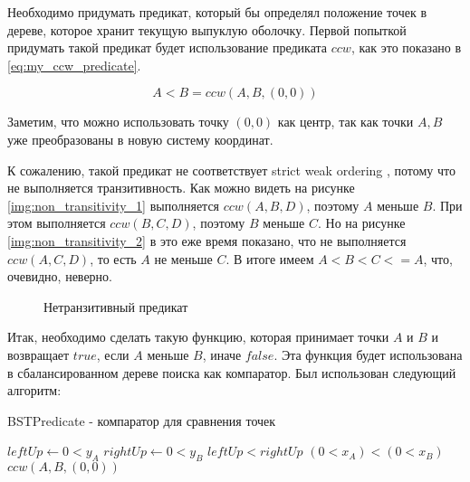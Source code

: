 Необходимо придумать предикат, который бы определял положение точек в дереве, которое хранит текущую выпуклую оболочку. Первой попыткой придумать такой предикат будет использование предиката $ccw$, как это показано в \ref{eq:my_ccw_predicate}.

\begin{equation}\label{eq:my_ccw_predicate}
A<B=ccw(A, B, (0, 0))
\end{equation}

Заметим, что можно использовать точку $(0, 0)$ как центр, так как точки $A, B$ уже преобразованы в новую систему координат.

К сожалению, такой предикат не соответствует strict weak ordering \cite{isoCppStd2017}, потому что не выполняется транзитивность. Как можно видеть на рисунке \ref{img:non_transitivity_1} выполняется $ccw(A, B, D)$, поэтому $A$ меньше $B$. При этом выполняется $ccw(B, C, D)$, поэтому $B$ меньше $C$. Но на рисунке \ref{img:non_transitivity_2} в это еже время показано, что не выполняется $ccw(A, C, D)$, то есть $A$ не меньше $C$. В итоге имеем $A < B < C <= A$, что, очевидно, неверно.

\begin{figure}[H]
	{\centering
		\hfill
		\subbottom[\label{img:non_transitivity_1}]{%
			}
		\hfill
		\subbottom[\label{img:non_transitivity_2}]{%
			}
		\hfill
	}
	\caption{Нетранзитивный предикат}
	\label{img:non_transitivity}
\end{figure}

Итак, необходимо сделать такую функцию, которая принимает точки $A$ и $B$ и возвращает $true$, если $A$ меньше $B$, иначе $false$. Эта функция будет использована в сбалансированном дереве поиска как компаратор. Был использован следующий алгоритм:

\begin{algorithm}[H]
	\caption{BSTPredicate - компаратор для сравнения точек}
	\label{alg:bst_predicate}
	\begin{algorithmic}[1]
		\State $leftUp \gets 0<y_A$
		\State $rightUp \gets 0<y_B$
			\Return $leftUp < rightUp$
		\EndIf
			\Return $(0<x_A) < (0<x_B)$
		\EndIf
		\Return $ccw(A, B, (0, 0))$
		\EndProcedure
	\end{algorithmic}
\end{algorithm}


